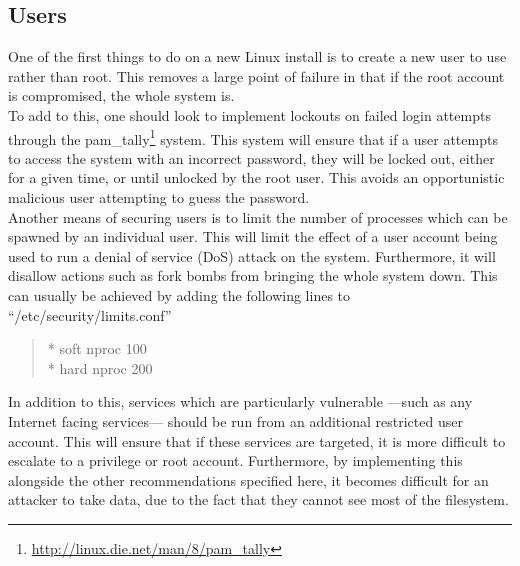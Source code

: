 \documentclass[a4paper,11pt]{report}
\begin{document}
			\subsection{Users}
				One of the first things to do on a new Linux install is to create a new user to use rather than root. 
				This removes a large point of failure in that if the root account is compromised, the whole system is.\\ 
				To add to this, one should look to implement lockouts on failed login attempts through the pam\_tally\footnote{\url{http://linux.die.net/man/8/pam\_tally}} system.
				This system will ensure that if a user attempts to access the system with an incorrect password, they will be locked out, either for a given time, or until unlocked by the root user. 
				This avoids an opportunistic malicious user attempting to guess the password. \\
				Another means of securing users is to limit the number of processes which can be spawned by an individual user. 
				This will limit the effect of a user account being used to run a denial of service (DoS) attack on the system. 
				Furthermore, it will disallow actions such as fork bombs from bringing the whole system down. 
				This can usually be achieved by adding the following lines to ``/etc/security/limits.conf''
				\begin{quote}
					\begin{flushleft}
						\** soft nproc 100 \\
						\** hard nproc 200 \\
					\end{flushleft}
				\end{quote}
				
				In addition to this, services which are particularly vulnerable
				---such as any Internet facing services---
				should be run from an additional restricted user account. 
				This will ensure that if these services are targeted, it is more difficult to escalate to a privilege or root account. 
				Furthermore, by implementing this alongside the other recommendations specified here, 
				it becomes difficult for an attacker to take data, due to the fact that they cannot see most of the filesystem.
\end{document}
